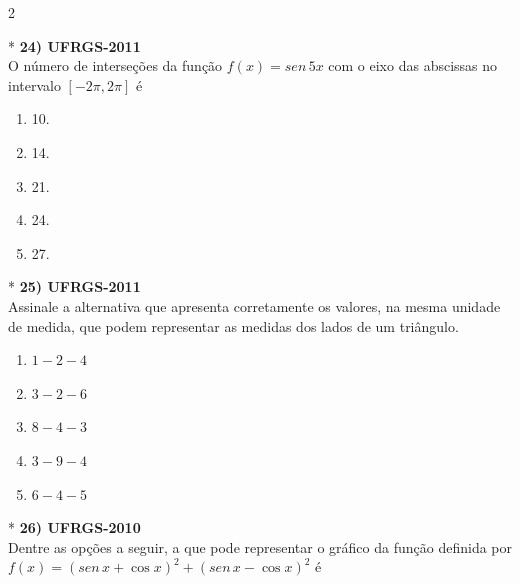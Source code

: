 \documentclass[11pt,a4paper]{article}
\begin{document}
\begin{paracol}{2}
    \switchcolumn[1]
    \vspace{6cm}

    \switchcolumn[0]*
    \textbf{24) UFRGS-2011} \\
    O número de interseções da função $f(x) = sen\, 5x$ com o eixo das abscissas no intervalo $[-2\pi, 2\pi]$ é

    \begin{enumerate}[label=(\Alph*), itemsep=0.2cm]
        \item 10.
        \item 14.
        \item 21.
        \item 24.
        \item 27.
    \end{enumerate}
    \vspace{0.4cm}

    \switchcolumn[1]
    \vspace{6cm}

    \switchcolumn[0]*
    \textbf{25) UFRGS-2011} \\
    Assinale a alternativa que apresenta corretamente os valores, na mesma unidade de medida, que podem representar as medidas dos lados de um triângulo.

    \begin{enumerate}[label=(\Alph*), itemsep=0.2cm]
        \item $1 - 2 - 4$
        \item $3 - 2 - 6$
        \item $8 - 4 - 3$
        \item $3 - 9 - 4$
        \item $6 - 4 - 5$
    \end{enumerate}
    \vspace{0.4cm}

    \switchcolumn[1]
    \vspace{6cm}

    \switchcolumn[0]*
    \textbf{26) UFRGS-2010} \\
    Dentre as opções a seguir, a que pode representar o gráfico da função definida por $f(x) = (sen\, x + \cos x)^2 + (sen\, x - \cos x)^2$ é


\end{paracol}
\end{document}
